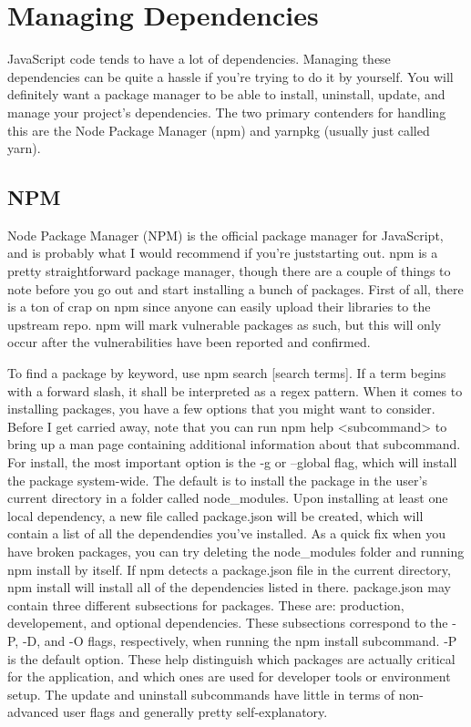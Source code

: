 \documentclass{article}
\begin{document}
\section{Managing Dependencies}

JavaScript code tends to have a lot of dependencies. Managing these dependencies can be quite a hassle if
you're trying to do it by yourself. You will definitely want a package manager to be able to install, uninstall,
update, and manage your project's dependencies. The two primary contenders for handling this are the Node
Package Manager (npm) and yarnpkg (usually just called yarn).

\subsection{NPM}

Node Package Manager (NPM) is the official package manager for JavaScript, and is probably what I would
recommend if you're juststarting out. npm is a pretty straightforward package manager, though there are a
couple of things to note before you go out and start installing a bunch of packages. First of all, there is a
ton of crap on npm since anyone can easily upload their libraries to the upstream repo. npm will mark
vulnerable packages as such, but this will only occur after the vulnerabilities have been reported and
confirmed.

To find a package by keyword, use npm search [search terms]. If a term begins with a forward slash, it shall be
interpreted as a regex pattern. When it comes to installing packages, you have a few options that you might
want to consider. Before I get carried away, note that you can run npm help <subcommand> to bring up a man
page containing additional information about that subcommand. For install, the most important option is the
-g or --global flag, which will install the package system-wide. The default is to install the package in the
user's current directory in a folder called node\_modules. Upon installing at least one local dependency, a new
file called package.json will be created, which will contain a list of all the dependendies you've installed.
As a quick fix when you have broken packages, you can try deleting the node\_modules folder and running
npm install by itself. If npm detects a package.json file in the current directory, npm install will install
all of the dependencies listed in there. package.json may contain three different subsections for packages.
These are: production, developement, and optional dependencies. These subsections correspond to the -P, -D,
and -O flags, respectively, when running the npm install subcommand. -P is the default option. These help
distinguish which packages are actually critical for the application, and which ones are used for developer
tools or environment setup. The update and uninstall subcommands have little in terms of non-advanced user
flags and generally pretty self-explanatory.
\end{document}
